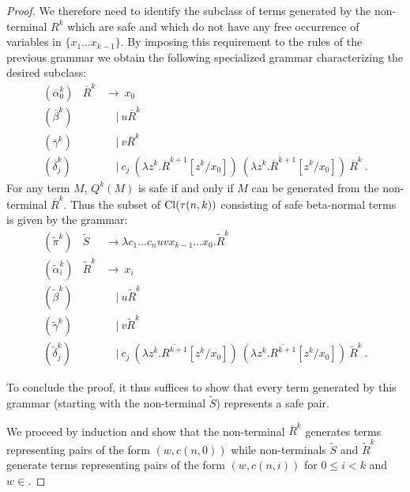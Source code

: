 \begin{proof}
We therefore need to identify the subclass of terms generated by the non-terminal $R^k$ which are safe and which do not have any free occurrence of variables in $\{x_1 \ldots x_{k-1}\}$. By imposing this requirement to the rules of the previous grammar we obtain the following specialized grammar characterizing the desired subclass:
\begin{eqnarray*}
  (\overline\alpha_0^k) &\overline R^k &\rightarrow\ x_0 \\
  (\overline\beta^k) && \quad|\  u \overline R^k \\
  (\overline\gamma^k) && \quad|\  v \overline R^k  \\
  (\overline\delta^k_j) && \quad|\  c_j\ (\lambda z^k. \overline R^{k+1}[z^k/x_0]) \ (\lambda z^k. \overline R^{k+1} [z^k/x_0]) \ \overline R^k \ .
\end{eqnarray*}
For any term $M$, $Q^k(M)$ is safe if and only if $M$ can be
generated from the non-terminal $\overline R^k$. Thus the subset of
${\rm Cl}(\tau(n,k))$ consisting of safe beta-normal terms is given
by the grammar:
\begin{eqnarray*}
  (\widetilde\pi^k) &\widetilde S &\rightarrow \lambda c_1 \ldots c_n u v x_{k-1} \ldots x_0 . \widetilde R^k \\
  (\widetilde\alpha_i^k) &\widetilde R^k &\rightarrow\ x_i \\
  (\widetilde\beta^k) && \quad|\  u \widetilde R^k \\
  (\widetilde\gamma^k) && \quad|\  v \widetilde R^k \\
  (\widetilde\delta^k_j) && \quad|\  c_j\ (\lambda z^k. \overline{R^{k+1}}[z^k/x_0]) \ (\lambda z^k. \overline{R^{k+1}}[z^k/x_0]) \ \widetilde R^k \ .
\end{eqnarray*}

To conclude the proof, it thus suffices to show that every term generated by this grammar (starting with the non-terminal $\widetilde S$) represents a safe pair.

We proceed by induction and show that the non-terminal $\overline
R^k$ generates terms representing pairs of the form $(w,c(n,0))$
while non-terminals $\widetilde S$ and $\widetilde R^k$ generate
terms representing pairs of the form $(w,c(n,i))$ for $0 \leq i<k$
and $w \in$\safedefset.


\end{proof}
